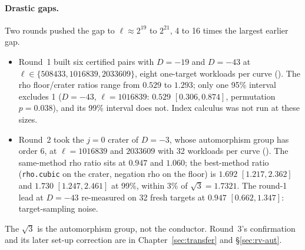 \paragraph{Drastic gaps.} Two rounds pushed the gap to $\ell\approx2^{19}$
to $2^{21}$, 4 to 16 times the largest earlier gap.
\begin{itemize}
\item Round~1 built six certified pairs with $D=-19$ and $D=-43$ at
  $\ell\in\{508433,1016839,2033609\}$, eight one-target workloads per
  curve ().
  The rho floor/crater ratios range from $0.529$ to $1.293$; only one 95\%
  interval excludes 1 ($D=-43$, $\ell=1016839$: $0.529$
  $[0.306,0.874]$, permutation $p=0.038$), and its 99\% interval does not.
  Index calculus was not run at these sizes.
\item Round~2 took the $j=0$ crater of $D=-3$, whose automorphism group has
  order 6, at $\ell=1016839$ and $2033609$ with 32 workloads per curve
  ().
  The same-method rho ratio sits at $0.947$ and $1.060$; the best-method
  ratio (\texttt{rho.cubic} on the crater, negation rho on the floor) is
  $1.692$ $[1.217,2.362]$ and $1.730$ $[1.247,2.461]$ at 99\%, within 3\%
  of $\sqrt3=1.7321$. The round-1 lead at $D=-43$ re-measured on 32 fresh
  targets at $0.947$ $[0.662,1.347]$: target-sampling noise.
\end{itemize}
The $\sqrt3$ is the automorphism group, not the conductor. Round~3's
confirmation and its later set-up correction are in
Chapter~\ref{sec:transfer} and \S\ref{sec:rv-aut}.


